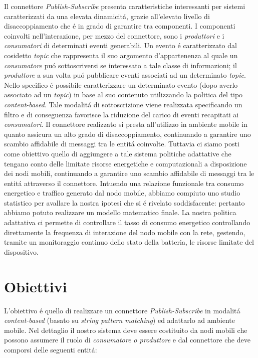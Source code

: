 \documentclass{article}
\begin{document}
Il connettore \textit{Publish-Subscribe} presenta caratteristiche interessanti per sistemi caratterizzati da una elevata dinamicit\'a, grazie all'elevato livello di disaccoppiamento che \'e in grado di garantire tra componenti. I componenti coinvolti nell'interazione, per mezzo del connettore, sono i \textit{produttori} e i \textit{consumatori} di determinati eventi generabili. Un evento \'e caratterizzato dal cosidetto \textit{topic} che rappresenta il suo argomento d'appartenenza al quale un \textit{consumatore} pu\'o sottoscriversi se interessato a tale classe di informazioni; il \textit{produttore} a sua volta pu\'o pubblicare eventi associati ad un determinato \textit{topic}. Nello specifico \'e possibile caratterizzare un determinato evento (dopo averlo associato ad un \textit{topic}) in base al suo contenuto utilizzando la politica del tipo \textit{content-based}. Tale modalit\'a di sottoscrizione viene realizzata specificando un filtro e di conseguenza favorisce la riduzione del carico di eventi recapitati ai \textit{consumatori}. Il connettore realizzato si presta all'utilizzo in ambiente mobile in quanto assicura un alto grado di disaccoppiamento, continuando a garantire uno scambio affidabile di messaggi tra le entit\'a coinvolte. Tuttavia ci siamo posti come obiettivo quello di aggiungere a tale sistema politiche adattative che tengano conto delle limitate risorse energetiche e computazionali a disposizione dei nodi mobili, continuando a garantire uno scambio affidabile di messaggi tra le entit\'a attraverso il connettore. Intuendo una relazione funzionale tra consumo energetico e traffico generato dal nodo mobile, abbiamo compiuto uno studio statistico per avallare la nostra ipotesi che si \'e rivelato soddisfacente: pertanto abbiamo potuto realizzare un modello matematico finale. 
La nostra politica adattativa ci permette di controllare il tasso di consumo energetico controllando direttamente la frequenza di interazione del nodo mobile con la rete, gestendo, tramite un monitoraggio continuo dello stato della batteria, le risorse limitate del dispositivo. %

\section{Obiettivi}

L'obiettivo \'e quello di realizzare un connettore \textit{Publish-Subscribe} in modalit\'a \textit{content-based} (basato su \textit{string pattern matching}) ed adattarlo ad ambiente mobile. Nel dettaglio il nostro sistema deve essere costituito da nodi mobili che possono assumere il ruolo di \textit{consumatore o produttore} e dal connettore che deve comporsi delle seguenti entit\'a:
\end{document}
